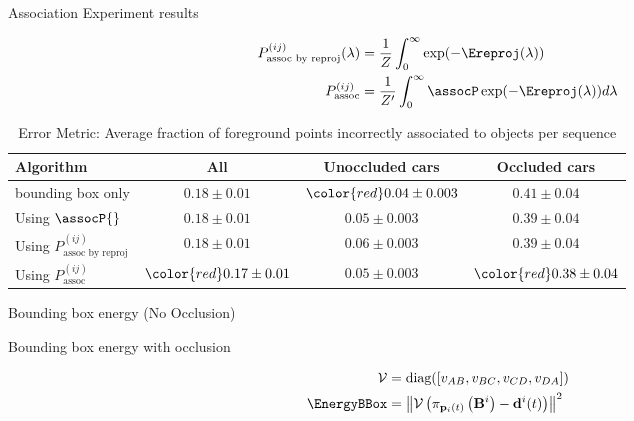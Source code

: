 \begin{frame}{Association Experiment results}

\begin{align}
  P^{(ij)}_{\text{assoc by reproj}}(\lambda) &= \frac{1}{Z}\int_0^{\infty}\exp(-\Ereproj(\lambda))\\
  P^{(ij)}_{\text{assoc}} &= \frac{1}{Z'}\int_0^{\infty} \assocP \exp(-\Ereproj(\lambda))d\lambda
  \label{eq:prob-assoc}
\end{align}

\begin{table}
  \centering
  \begin{tabular}{lccc}
    \toprule
    Algorithm & All & Unoccluded cars & Occluded cars \\
    \midrule
    bounding box only                         & $0.18\pm0.01$          & $\color{red}0.04\pm0.003$  & $0.41\pm0.04$\\
    Using $\assocP{}$                         & $0.18\pm0.01$          & $0.05\pm0.003$           & $0.39\pm0.04$ \\
    Using $P^{(ij)}_{\text{assoc by reproj}}$ & $0.18\pm0.01$          & $0.06\pm0.003$           & $0.39\pm0.04$\\
    Using $P^{(ij)}_{\text{assoc}}$           & $\color{red}0.17\pm0.01$ & $0.05\pm0.003$           & $\color{red}0.38\pm0.04$\\
    \bottomrule
  \end{tabular}
  \caption{Error Metric: Average fraction of foreground points incorrectly associated to objects per sequence}
\end{table}
\end{frame}

\begin{frame}{Bounding box energy (No Occlusion)}
  \centering
  \begin{figure}
    
  \end{figure}
\end{frame}

\begin{frame}{Bounding box energy with occlusion}
  \centering
  
  \begin{align}
    \mathcal{V} &= \text{diag}([v_{AB}, v_{BC}, v_{CD}, v_{DA}])\\
    \EnergyBBox &= \left\| \mathcal{V} \left(\projectionOf{\dimsn{i}}-\bbt{i}{t}\right) \right\|^2
  \end{align}
\end{frame}

